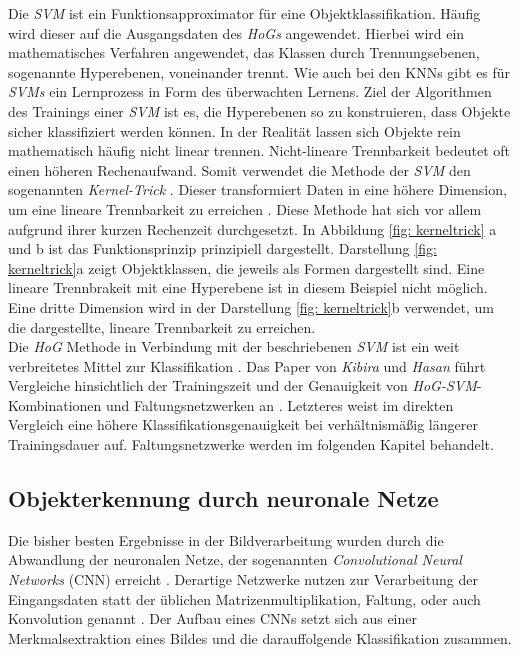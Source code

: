 		
		
		Die \textit{SVM} ist ein Funktionsapproximator für eine Objektklassifikation. Häufig wird dieser auf die Ausgangsdaten des \textit{HoGs} angewendet. Hierbei wird ein mathematisches Verfahren angewendet, das Klassen durch Trennungsebenen, sogenannte Hyperebenen, voneinander trennt. Wie auch bei den KNNs gibt es für \textit{SVMs} ein Lernprozess in Form des überwachten Lernens. Ziel der Algorithmen des Trainings einer \textit{SVM} ist es, die Hyperebenen so zu konstruieren, dass Objekte sicher klassifiziert werden können. In der Realität lassen sich Objekte rein mathematisch häufig nicht linear trennen. Nicht-lineare Trennbarkeit bedeutet oft einen höheren Rechenaufwand. Somit verwendet die Methode der \textit{SVM} den sogenannten \textit{Kernel-Trick} \cite{svmalt}. Dieser transformiert Daten in eine höhere Dimension, um eine lineare Trennbarkeit zu erreichen \cite{svmalt}. Diese Methode hat sich vor allem aufgrund ihrer kurzen Rechenzeit durchgesetzt. In Abbildung \ref{fig: kerneltrick} a und b ist das Funktionsprinzip prinzipiell dargestellt. Darstellung \ref{fig: kerneltrick}a zeigt Objektklassen, die jeweils als Formen dargestellt sind. Eine lineare Trennbrakeit mit eine Hyperebene ist in diesem Beispiel nicht möglich. Eine dritte Dimension wird in der Darstellung \ref{fig: kerneltrick}b verwendet, um die dargestellte, lineare Trennbarkeit zu erreichen.\\
		
		
			
		Die \textit{HoG} Methode in Verbindung mit der beschriebenen \textit{SVM} ist ein weit verbreitetes Mittel zur Klassifikation \cite{hogsvmvscnn}. Das Paper von \textit{Kibira} und \textit{Hasan} führt Vergleiche hinsichtlich der Trainingszeit und der Genauigkeit von \textit{HoG-SVM}-Kombinationen und Faltungsnetzwerken an \cite{hogsvmvscnn}. Letzteres weist im direkten Vergleich eine höhere Klassifikationsgenauigkeit bei verhältnismäßig längerer Trainingsdauer auf. Faltungsnetzwerke werden im folgenden Kapitel behandelt. 
	
		\subsection{Objekterkennung durch neuronale Netze}
		\label{subsec: Objekterkennung durch neuronale Netze}
		Die bisher besten Ergebnisse in der Bildverarbeitung wurden durch die Abwandlung der neuronalen Netze, der sogenannten \textit{Convolutional Neural Networks} (CNN) erreicht \cite{deeplearning}. Derartige Netzwerke nutzen zur Verarbeitung der Eingangsdaten statt der üblichen Matrizenmultiplikation, Faltung, oder auch Konvolution genannt \cite{deeplearning}. Der Aufbau eines CNNs setzt sich aus einer Merkmalsextraktion eines Bildes und die darauffolgende Klassifikation zusammen.\\ 
		
